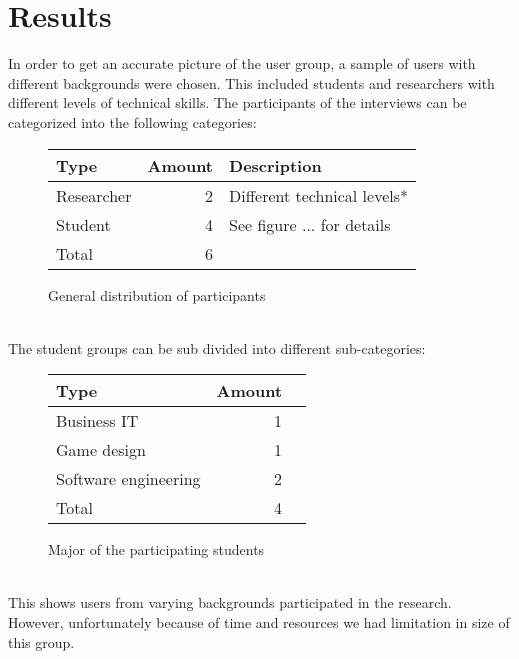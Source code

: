 \documentclass[conference]{IEEEtran}
\begin{document}
\section{Results}
	In order to get an accurate picture of the user group, a sample of users with different backgrounds were chosen. This included students and researchers with different levels of technical skills. The participants of the interviews can be categorized into the following categories:
	\begin{figure}[ht]
		\centering
		\begin{tabular}{ | l | r | l | }
			\hline
			Type			& Amount	& Description \\ \hline \hline
			Researcher		& 2			& Different technical levels* \\ \hline
			Student			& 4			& See figure ... for details \\ \hline \hline
			Total			& 6			& \\ \hline
		\end{tabular}
		\caption{General distribution of participants}
	\end{figure}\\
	The student groups can be sub divided into different sub-categories:
	\begin{figure}[ht]
		\centering
		\begin{tabular}{ | l | r | l | }
			\hline
			Type					& Amount \\ \hline \hline
			Business IT				& 1 \\ \hline
			Game design				& 1 \\ \hline
			Software engineering	& 2 \\ \hline
			Total					& 4 \\ \hline
		\end{tabular}
		\caption{Major of the participating students}
	\end{figure} \\
	This shows users from varying backgrounds participated in the research. However, unfortunately because of time and resources we had limitation in size of this group.
\end{document}
